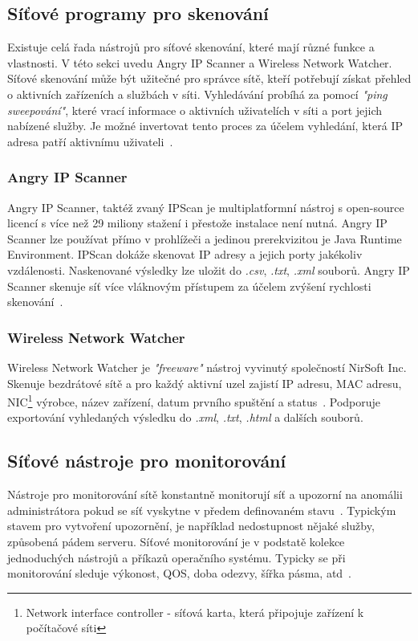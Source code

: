     \subsection{Síťové programy pro skenování}
            Existuje celá řada nástrojů pro síťové skenování, které mají různé funkce a vlastnosti. V této sekci uvedu Angry \gls{IP} Scanner a Wireless Network Watcher. Síťové skenování může být užitečné pro správce sítě, kteří potřebují získat přehled o aktivních zařízeních a službách v síti. Vyhledávání probíhá za pomocí \textit{"ping sweepování"}, které vrací informace o aktivních uživatelích v síti a port jejich nabízené služby. Je možné invertovat tento proces za účelem vyhledání, která \gls{IP} adresa patří aktivnímu uživateli~\cite{FundamentalsOfNetworkForensicsReference}. 
            
            \subsubsection*{Angry \gls{IP} Scanner}
                Angry \gls{IP} Scanner, taktéž zvaný IPScan je multiplatformní nástroj s open-source licencí s více než 29 miliony stažení i přestože instalace není nutná. Angry \gls{IP} Scanner lze používat přímo v prohlížeči a jedinou prerekvizitou je Java Runtime Environment. IPScan dokáže skenovat \gls{IP} adresy a jejich porty jakékoliv vzdálenosti. Naskenované výsledky lze uložit do \textit{.csv}, \textit{.txt}, \textit{.xml} souborů. Angry \gls{IP} Scanner skenuje síť více vláknovým přístupem za účelem zvýšení rychlosti skenování~\cite{IPScanReference}.

            \subsubsection*{Wireless Network Watcher}
                Wireless Network Watcher je \textit{"freeware"} nástroj vyvinutý společností NirSoft Inc. Skenuje bezdrátové sítě a pro každý aktivní uzel zajistí \gls{IP} adresu, \gls{MAC} adresu, NIC\footnote{Network interface controller - síťová karta, která připojuje zařízení k počítačové síti} výrobce, název zařízení, datum prvního spuštění a status~\cite{FundamentalsOfNetworkForensicsReference}. Podporuje exportování vyhledaných výsledku do \textit{.xml}, \textit{.txt}, \textit{.html} a dalších souborů.
                
        \subsection{Síťové nástroje pro monitorování}
            Nástroje pro monitorování sítě konstantně monitorují síť a upozorní na anomálii  administrátora pokud se síť vyskytne v předem definovaném stavu~\cite{EnisaReference}. Typickým stavem pro vytvoření upozornění, je například nedostupnost nějaké služby, způsobená pádem serveru. Síťové monitorování je v podstatě kolekce jednoduchých nástrojů a příkazů operačního systému. Typicky se při monitorování sleduje výkonost, \gls{QOS}, doba odezvy, šířka pásma, atd~\cite{FundamentalsOfNetworkForensicsReference}.


